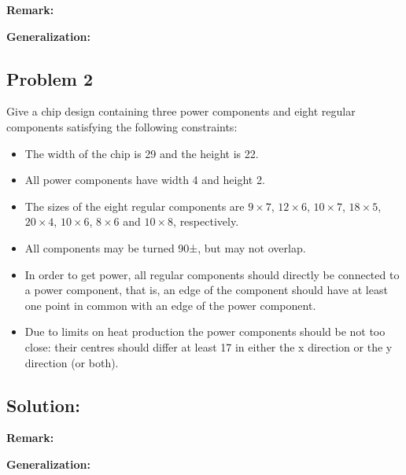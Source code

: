 \documentclass[11pt]{article}
\begin{document}
\vspace{3mm}

{\bf Remark:}

\vspace{3mm}

{\bf Generalization:}


\vspace{5mm}

\subsection*{Problem 2}

Give a chip design containing three power components and eight regular components satisfying the following constraints:
\begin{itemize}
  \item The width of the chip is 29 and the height is 22.
  \item All power components have width 4 and height 2.
  \item The sizes of the eight regular components are $9 \times 7$, $12 \times 6$, $10 \times 7$, $18 \times 5$, $20 \times 4$, $10 \times 6$, $8 \times 6$ and $10 \times 8$, respectively.
  \item All components may be turned 90±, but may not overlap.
  \item In order to get power, all regular components should directly be connected to a power component, that is, an edge of the component should have at least one point in common with an edge of the power component.
  \item Due to limits on heat production the power components should be not too close: their centres should differ at least 17 in either the x direction or the y direction (or both).
\end{itemize}

\vspace{4mm}

\subsection*{Solution:}

\vspace{3mm}

{\bf Remark:}

\vspace{3mm}

{\bf Generalization:}

\vspace{5mm}
\end{document}
